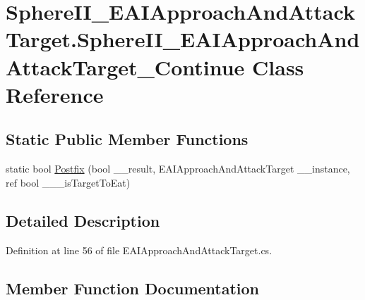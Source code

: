\hypertarget{class_sphere_i_i___e_a_i_approach_and_attack_target_1_1_sphere_i_i___e_a_i_approach_and_attack_target___continue}{}\section{Sphere\+I\+I\+\_\+\+E\+A\+I\+Approach\+And\+Attack\+Target.\+Sphere\+I\+I\+\_\+\+E\+A\+I\+Approach\+And\+Attack\+Target\+\_\+\+Continue Class Reference}
\label{class_sphere_i_i___e_a_i_approach_and_attack_target_1_1_sphere_i_i___e_a_i_approach_and_attack_target___continue}
\subsection*{Static Public Member Functions}
\begin{DoxyCompactItemize}
\item 
static bool \mbox{\hyperlink{class_sphere_i_i___e_a_i_approach_and_attack_target_1_1_sphere_i_i___e_a_i_approach_and_attack_target___continue_af248b792be0e7b44141890956e062e8e}{Postfix}} (bool \+\_\+\+\_\+result, E\+A\+I\+Approach\+And\+Attack\+Target \+\_\+\+\_\+instance, ref bool \+\_\+\+\_\+\+\_\+is\+Target\+To\+Eat)
\end{DoxyCompactItemize}


\subsection{Detailed Description}


Definition at line 56 of file E\+A\+I\+Approach\+And\+Attack\+Target.\+cs.



\subsection{Member Function Documentation}
\mbox{\label{class_sphere_i_i___e_a_i_approach_and_attack_target_1_1_sphere_i_i___e_a_i_approach_and_attack_target___continue_af248b792be0e7b44141890956e062e8e}} 
